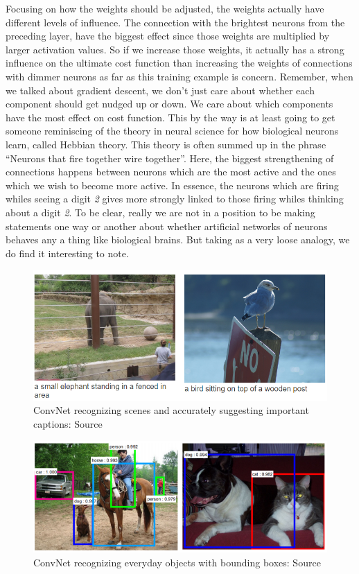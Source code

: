 \documentclass[master]{thesis-uestc}
\begin{document}
Focusing on how the weights should be adjusted, the weights actually have different levels of influence. The connection with the brightest neurons from the preceding layer, have the biggest effect since those weights are multiplied by larger activation values. So if we increase those weights, it actually has a strong influence on the ultimate cost function than increasing the weights of connections with dimmer neurons as far as this training example is concern. Remember, when we talked about gradient descent, we don't just care about whether each component should get nudged up or down. We care about which components have the most effect on cost function. This by the way is at least going to get someone reminiscing of the theory in neural science for how biological neurons learn, called Hebbian theory. This theory is often summed up in the phrase ``Neurons that fire together wire together''. Here, the biggest strengthening of connections happens between neurons which are the most active and the ones which we wish to become more active. In essence, the neurons which are firing whiles seeing a digit \textit{2} gives more strongly linked to those firing whiles thinking about a digit \textit{2}. To be clear, really we are not in a position to be making statements one way or another about whether artificial networks of neurons behaves any a thing like biological brains. But taking as a very loose analogy, we do find it interesting to note.

\begin{figure}[ht]
\includegraphics[width=5in]{pic/CNN_example.PNG}
\caption{ConvNet recognizing scenes and accurately suggesting important captions: Source }
\label{cnn_example}
\end{figure}

\begin{figure}[ht]
\includegraphics[width=5in]{pic/everyday_objects.PNG}
\caption{ConvNet recognizing everyday objects with bounding boxes: Source }
\label{everyday_objects}
\end{figure}
\end{document}
